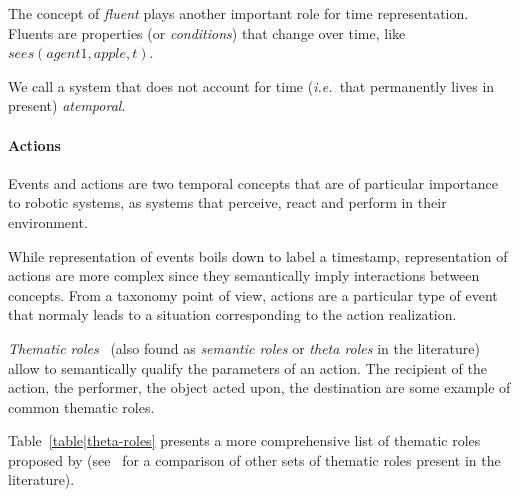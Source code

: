 \documentclass[a4paper, twocolumn]{article}
\newcommand{\ie}{{\textit{i.e.\ }}}
\begin{document}

The concept of \emph{fluent} plays another important role for time
representation. Fluents are properties (or \emph{conditions}) that change over
time, like $sees(agent1, apple, t)$.

We call a system that does not account for time (\ie that permanently lives in
present) \emph{atemporal}.


\paragraph{Actions}

Events and actions are two temporal concepts that are of particular importance to
robotic systems, as systems that perceive, react and perform in their environment.

While representation of events boils down to label a timestamp,
representation of actions are more complex since they semantically imply
interactions between concepts. From a taxonomy point of view, actions are a
particular type of event that normaly leads to a situation corresponding to the
action realization.


\emph{Thematic roles}~\cite{Gruber1965} (also found as \emph{semantic roles} or
\emph{theta roles} in the literature) allow to semantically qualify the
parameters of an action. The recipient of the action, the performer, the object
acted upon, the destination are some example of common thematic roles.

Table~\ref{table|theta-roles} presents a more comprehensive list of thematic
roles proposed by \cite{Aarts1997} (see~\cite{Gutierrez2001} for a comparison
of other sets of thematic roles present in the literature).
\end{document}
